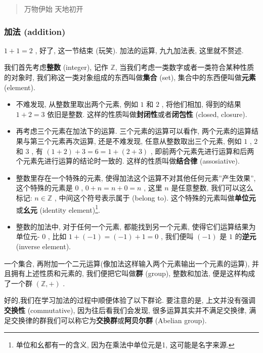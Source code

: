 \begin{quote}
万物伊始 天地初开
\end{quote}

\hypertarget{ux52a0ux6cd5-addition}{%
\subsubsection{加法 (addition)}\label{ux52a0ux6cd5-addition}}

\(1+1=2\) , 好了, 这一节结束 (玩笑). 加法的运算, 九九加法表,
这里就不赘述.

我们首先考虑\textbf{整数} (integer), 记作 \(\mathbb{Z}\),
当我们考虑一类数字或者一类符合某种性质的对象时,
我们称这一类对象组成的东西叫做\textbf{集合} (set),
集合中的东西便叫做\textbf{元素} (element).

\begin{itemize}
\tightlist
\item
  不难发现, 从整数里取出两个元素, 例如 \(1\) 和 \(2\) , 将他们相加,
  得到的结果 \(1+2=3\) 依旧是整数.
  这样的性质叫做\textbf{封闭性}或者\textbf{闭包性} (closed, closure).
\item
  再考虑三个元素在加法下的运算. 三个元素的运算可以看作,
  两个元素的运算结果与第三个元素再次运算, 还是不难发现,
  任意从整数取出三个元素, 例如 \(1\) , \(2\) 和 \(3\) , 有
  \((1+2)+3=6=1+(2+3)\) ,
  即前两个元素先进行运算和后两个元素先进行运算的结论时一致的.
  这样的性质叫做\textbf{结合律} (assosiative).
\item
  整数里存在一个特殊的元素,
  使得加法这个运算不对其他任何元素''产生效果'', 这个特殊的元素是 \(0\) ,
  \(0+n=n+0=n\) , 这里 \(n\) 是任意整数, 我们可以这么标记:
  \(n\in\mathbb{Z}\) , 中间这个符号表示属于 (belong to).
  这个特殊的元素叫做\textbf{单位元}或\textbf{幺元} (identity
  element)\footnote{单位和幺都有一的含义, 因为在乘法中单位元是1,
    这可能是名字来源.}.
\item
  整数的加法中, 对于任何一个元素, 都能找到另一个元素,
  使得它们运算结果为单位元- \(0\) , 比如 \(1+(−1)=(−1)+1=0\) , 我们便叫
  \((−1)\) 是 \(1\) 的\textbf{逆元} (inverse element).
\end{itemize}

一个集合, 再附加一个二元运算(像加法这样输入两个元素输出一个元素的运算),
并且拥有上述性质和元素的, 我们便把它叫做\textbf{群} (group), 整数和加法,
便是这样构成了一个群 \((\mathbb{Z},+)\) .

好的,我们在学习加法的过程中顺便体验了以下群论. 要注意的是,
上文并没有强调\textbf{交换性} (commutative), 因为往后看我们会发现,
很多运算其实并不满足交换律,
满足交换律的群我们可以称它为\textbf{交换群}或\textbf{阿贝尔群} (Abelian
group).

